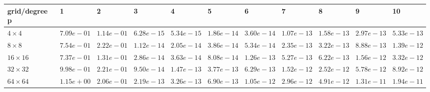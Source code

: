 \begin{tabular}{lllllllllll}
\hline
 grid/degree p   & 1          & 2          & 3          & 4          & 5          & 6          & 7          & 8          & 9          & 10         \\
\hline
 $4 \times 4$    & $7.09e-01$ & $1.14e-01$ & $6.28e-15$ & $5.34e-15$ & $1.86e-14$ & $3.60e-14$ & $1.07e-13$ & $1.58e-13$ & $2.97e-13$ & $5.33e-13$ \\
 $8 \times 8$    & $7.54e-01$ & $2.22e-01$ & $1.12e-14$ & $2.05e-14$ & $3.86e-14$ & $5.34e-14$ & $2.35e-13$ & $3.22e-13$ & $8.88e-13$ & $1.39e-12$ \\
 $16 \times 16$  & $7.37e-01$ & $1.31e-01$ & $2.86e-14$ & $3.63e-14$ & $8.08e-14$ & $1.26e-13$ & $5.27e-13$ & $6.22e-13$ & $1.56e-12$ & $3.32e-12$ \\
 $32 \times 32$  & $9.98e-01$ & $2.21e-01$ & $9.50e-14$ & $1.47e-13$ & $3.77e-13$ & $6.29e-13$ & $1.52e-12$ & $2.52e-12$ & $5.78e-12$ & $8.92e-12$ \\
 $64 \times 64$  & $1.15e+00$ & $2.06e-01$ & $2.19e-13$ & $3.26e-13$ & $6.90e-13$ & $1.05e-12$ & $2.96e-12$ & $4.91e-12$ & $1.31e-11$ & $1.94e-11$ \\
\hline
\end{tabular}